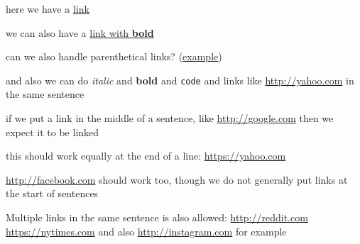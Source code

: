 
here we have a \href{www.yahoo.com}{link}

we can also have a \href{http://github.com}{link with \textbf{bold}}

can we also handle parenthetical links? (\href{www.yahoo.com}{example})

and also we can do \emph{italic} and \textbf{bold} and \verb|code| and links like \url{http://yahoo.com} in the same sentence

if we put a link in the middle of a sentence, like \url{http://google.com} then we expect it to be linked

this should work equally at the end of a line: \url{https://yahoo.com}

\url{http://facebook.com} should work too, though we do not generally put links at the start of sentences

Multiple links in the same sentence is also allowed: \url{http://reddit.com} \url{https://nytimes.com} and also \url{http://instagram.com} for example
